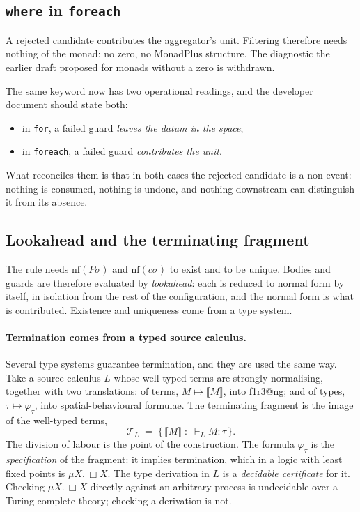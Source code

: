\documentclass[11pt]{article}
\makeatletter
\theoremstyle{definition}
\theoremstyle{plain}
\theoremstyle{remark}
\newcommand{\sem}[1]{\llbracket #1 \rrbracket}
\newcommand{\nf}{\mathrm{nf}}
\newcommand{\fe}{\texttt{foreach}}
\newcommand{\flang}{\textsf{f1r3\textbar @ng}}
\makeatother
\begin{document}
\subsection{\texttt{where} in \texttt{foreach}}
\label{sec:where}

A rejected candidate contributes the aggregator's unit. Filtering therefore
needs nothing of the monad: no zero, no MonadPlus structure. The diagnostic the
earlier draft proposed for monads without a zero is withdrawn.

The same keyword now has two operational readings, and the developer document
should state both:
\begin{itemize}[nosep]
\item in \texttt{for}, a failed guard \emph{leaves the datum in the space};
\item in \fe{}, a failed guard \emph{contributes the unit}.
\end{itemize}
What reconciles them is that in both cases the rejected candidate is a
non-event: nothing is consumed, nothing is undone, and nothing downstream can
distinguish it from its absence.

\subsection{Lookahead and the terminating fragment}
\label{sec:lookahead}

The rule needs \(\nf(P\sigma)\) and \(\nf(c\sigma)\) to exist and to be unique.
Bodies and guards are therefore evaluated by \emph{lookahead}: each is reduced
to normal form by itself, in isolation from the rest of the configuration, and
the normal form is what is contributed. Existence and uniqueness come from a
type system.

\paragraph{Termination comes from a typed source calculus.} Several type
systems guarantee termination, and they are used the same way. Take a source
calculus \(L\) whose well-typed terms are strongly normalising, together with
two translations: of terms, \(M \mapsto \sem{M}\), into \flang{}; and of types,
\(\tau \mapsto \varphi_\tau\), into spatial-behavioural formulae. The
terminating fragment is the image of the well-typed terms,
\[
\mathcal{T}_L \;=\; \{\, \sem{M} \;:\; \vdash_L M : \tau \,\}.
\]
The division of labour is the point of the construction. The formula
\(\varphi_\tau\) is the \emph{specification} of the fragment: it implies
termination, which in a logic with least fixed points is \(\mu X.\,\Box X\).
The type derivation in \(L\) is a \emph{decidable certificate} for it. Checking
\(\mu X.\,\Box X\) directly against an arbitrary process is undecidable over a
Turing-complete theory; checking a derivation is not.
\end{document}
